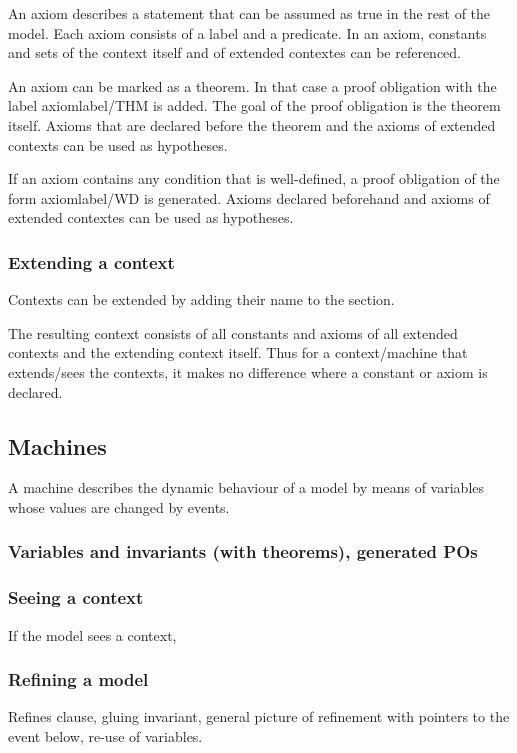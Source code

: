 An axiom describes a statement that can be assumed as true in the rest of the model.
Each axiom consists of a label and a predicate.
In an axiom, constants and sets of the context itself and of extended contextes can be referenced.

An axiom can be marked as a theorem. In that case a proof obligation with the label \textsf{axiomlabel/THM} is added.
The goal of the proof obligation is the theorem itself.
Axioms that are declared before the theorem and the axioms of extended contexts can be used as hypotheses.

If an axiom contains any condition that is well-defined, a proof obligation of the form \textsf{axiomlabel/WD} is generated.
Axioms declared beforehand and axioms of extended contextes can be used as hypotheses.
   
\subsubsection{Extending a context}
Contexts can be extended by adding their name to the  section.

The resulting context consists of all constants and axioms of all extended contexts and the extending context itself.
Thus for a context/machine that extends/sees the contexts, it makes no difference where a constant or axiom is declared.

\subsection{Machines}
A machine describes the dynamic behaviour of a model by means of variables whose values are changed by events.

\subsubsection{Variables and invariants (with theorems), generated POs}

\subsubsection{Seeing a context}
If the model sees a context, 

\subsubsection{Refining a model}

Refines clause, gluing invariant, general picture of refinement with pointers to the event below, re-use of variables.

